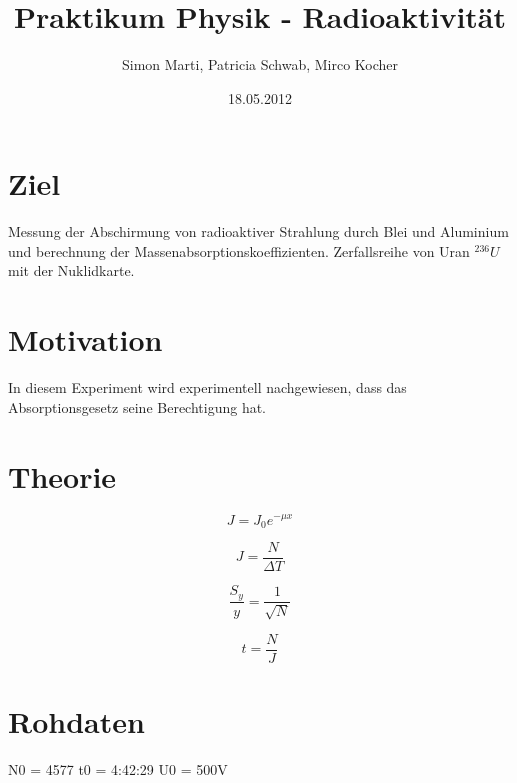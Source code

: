 \documentclass[12pt,a4paper]{article}
\title{Praktikum Physik - Radioaktivität}
\author{Simon Marti, Patricia Schwab, Mirco Kocher}
\date{18.05.2012}
\begin{document}
\maketitle

\section*{Ziel}
Messung der Abschirmung von radioaktiver Strahlung durch Blei und Aluminium und berechnung der Massenabsorptionskoeffizienten. Zerfallsreihe von Uran $^{236}U$ mit der Nuklidkarte.

\section*{Motivation}
In diesem Experiment wird experimentell nachgewiesen, dass das Absorptionsgesetz seine Berechtigung hat.

\section*{Theorie}
\begin{equation}
J = J_0 e^{-\mu x}
\end{equation}

\begin{equation}
J =\frac{N}{\Delta T}
\end{equation}

\begin{equation}
\frac{S_y}{y} = \frac{1}{\sqrt{N}}
\end{equation}

\begin{equation}
t = \frac{N}{J}
\end{equation}

\section*{Rohdaten}
N0 = 4577
t0 = 4:42:29
U0 = 500V
\end{document}
